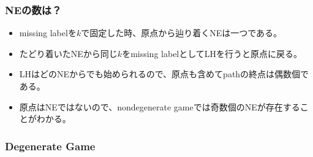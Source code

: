 \documentclass[dvipdfmx, 12pt]{beamer}
\begin{document}
\begin{frame}\frametitle{NEの数は？}
\begin{itemize}
	\item missing labelを$k$で固定した時、原点から辿り着くNEは一つである。
	\item たどり着いたNEから同じ$k$をmissing labelとしてLHを行うと原点に戻る。
	\item LHはどのNEからでも始められるので、原点も含めてpathの終点は偶数個である。
	\item 原点はNEではないので、nondegenerate gameでは奇数個のNEが存在することがわかる。
\end{itemize}
\end{frame}

\begin{frame}\frametitle{Degenerate Game}

\end{frame}
\end{document}
